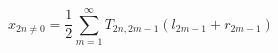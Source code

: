 \begin{equation}
	x_{2n\neq0}=\frac{1}{2}\sum^{\infty}_{m=1}T_{2n,2m-1}(l_{2m-1}+r_{2m-1})
\end{equation}


